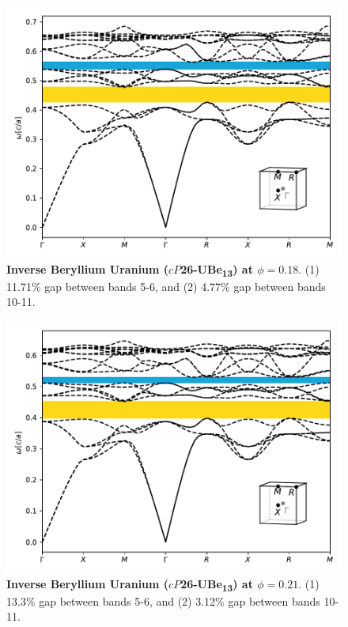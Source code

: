 \documentclass[fleqn,amsmath,amssymb,superscriptaddress, reprint,prl]{revtex4-1}
\begin{document}
\begin{figure}
\includegraphics[width=0.9\linewidth]{workspace/2daf55e2f48936956885f738f5ee338a/images/r=24.pdf}
	\caption{\textbf{Inverse Beryllium Uranium ($cP$26-UBe\textsubscript{1}\textsubscript{3}) at $\phi=0.18$}. (1) 11.71\% gap between bands 5-6, and (2) 4.77\% gap between bands 10-11.}
\end{figure}

\begin{figure}
\includegraphics[width=0.9\linewidth]{workspace/2daf55e2f48936956885f738f5ee338a/images/r=23.pdf}
	\caption{\textbf{Inverse Beryllium Uranium ($cP$26-UBe\textsubscript{1}\textsubscript{3}) at $\phi=0.21$}. (1) 13.3\% gap between bands 5-6, and (2) 3.12\% gap between bands 10-11.}
\end{figure}
\end{document}
